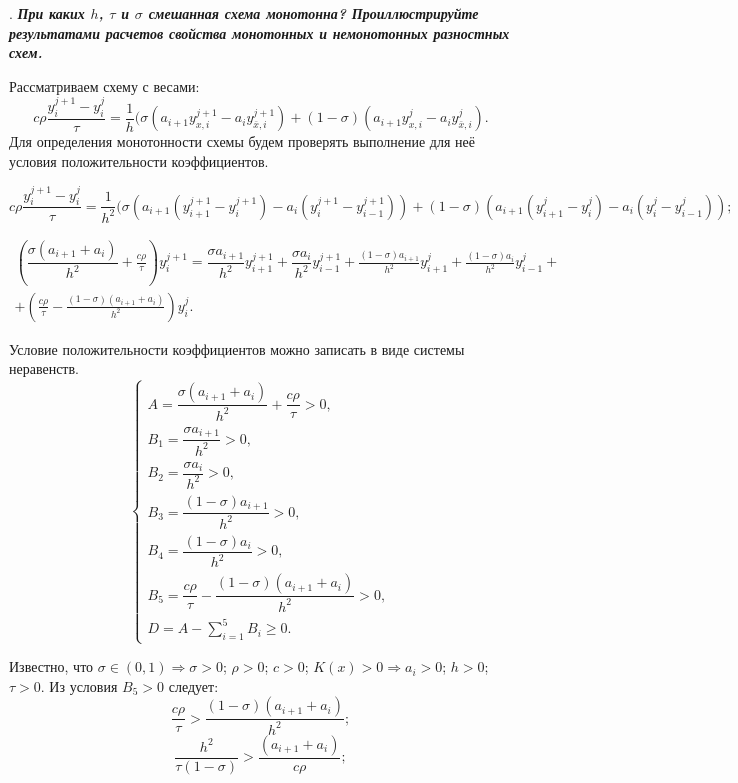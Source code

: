 \documentclass[12pt, a4paper]{article}
\newcounter{mycounter}
\newcommand{\quastion}[1]{%
	\stepcounter{mycounter}%
	\textbf{\themycounter}.  %
	\textbf{\textit{#1}}
	
}
\begin{document}
	\clearpage %
	\quastion{При каких $h$, $\tau$ и $\sigma$ смешанная схема монотонна? Проиллюстрируйте результатами расчетов свойства монотонных и немонотонных разностных схем.}
		
	Рассматриваем схему с весами:
	\[
	c \rho \frac{y^{j+1}_i - y^{j}_i}{\tau} = \frac{1}{h} (\sigma(a_{i+1} y^{j+1}_{x,i} - a_{i} y^{j+1}_{\bar{x},i}) + (1-\sigma)(a_{i+1} y^{j}_{x,i} - a_{i} y^{j}_{\bar{x},i}).
	\]
	Для определения монотонности схемы будем проверять выполнение для неё условия положительности коэффициентов.
	
	\[
	c \rho \frac{y^{j+1}_i - y^{j}_i}{\tau} = \frac{1}{h^2} (\sigma(a_{i+1}(y^{j+1}_{i+1} -  y^{j+1}_{i}) - a_{i}(y^{j+1}_i - y_{i-1}^{j+1})) + (1-\sigma)(a_{i+1} (y^{j}_{i+1}-y^{j}_{i}) - a_{i} (y^{j}_i - y_{i-1}^{j}));
	\]
	
	\begin{multline*}
			(\dfrac{\sigma(a_{i+1}+a_i)}{h^2}+\frac{c \rho}{\tau})y_i^{j+1} = \dfrac{\sigma a_{i+1}}{h^2}y_{i+1}^{j+1} + \dfrac{\sigma a_{i}}{h^2}y_{i-1}^{j+1} + \frac{(1-\sigma)a_{i+1}}{h^2}y_{i+1}^j + \frac{(1-\sigma)a_{i}}{h^2}y_{i-1}^j +\\ 
			+(\frac{c \rho}{\tau} - \frac{(1-\sigma)(a_{i+1}+a_i)}{h^2})y_i^j.
	\end{multline*}
	
	Условие положительности коэффициентов можно записать в виде системы неравенств.
	\[
	\begin{cases}
			A = \dfrac{\sigma(a_{i+1}+a_i)}{h^2}+\dfrac{c \rho}{\tau} > 0,\\
			B_1 = \dfrac{\sigma a_{i+1}}{h^2} > 0,\\
			B_2 = \dfrac{\sigma a_{i}}{h^2} > 0,\\
			B_3 = \dfrac{(1-\sigma)a_{i+1}}{h^2} > 0,\\
			B_4 = \dfrac{(1-\sigma)a_{i}}{h^2} > 0,\\
			B_5 = \dfrac{c \rho}{\tau} - \dfrac{(1-\sigma)(a_{i+1}+a_i)}{h^2} > 0,\\
			D = A - \sum_{i=1}^{5}B_i \ge 0.
	\end{cases}
	\]

Известно, что $\sigma \in (0,1) \Rightarrow \sigma > 0$; $\rho > 0$; $c > 0$; $K(x) > 0 \Rightarrow a_i > 0$; $h>0$; $\tau>0$.
Из условия $B_5 > 0$ следует:
\[
\dfrac{c \rho}{\tau}  > \dfrac{(1-\sigma)(a_{i+1}+a_i)}{h^2};
\]
\begin{equation}
\label{ineq}
\dfrac{h^2}{\tau(1-\sigma)} > \dfrac{(a_{i+1}+a_i)}{c \rho};
\end{equation}
\end{document}
